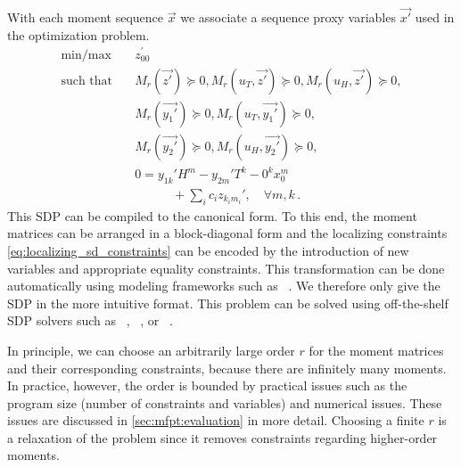 With each moment sequence $\vec x$ we associate a sequence proxy variables $\vec{x'}$
used in the optimization problem.
\begin{equation}\label{eq:sdp_for_fpt}
    \begin{split}
	    \text{min} / \text{max} \hspace{1em}&  z_{00}^{\prime} \\
        \text{such that}\hspace{1em} & M_r(\vec{z'})\succeq 0,
                   M_r({u}_T, \vec{z'})\succeq 0, M_r({u}_H, \vec{z'})\succeq 0,\\
        & M_r(\vec{y_1'}) \succeq 0, M_r({u}_T,\vec{y_1'}) \succeq 0,\\
        & M_r(\vec{y_2'}) \succeq 0, M_r({u}_H, \vec{y_2'}) \succeq 0,\\
        & 0= y_{1k}' H^m -  y_{2m}'T^k - 0^k x_0^m \\
	    &\qquad\quad+\sum_i c_i  z_{k_i m_i}', \quad\forall m, k\,.
    \end{split}
\end{equation}
This \ac{SDP} can be compiled to the canonical form.
To this end, the moment matrices can be arranged in a block-diagonal form and the
localizing constraints \eqref{eq:localizing_sd_constraints} can be encoded
by the introduction of new variables and appropriate equality constraints.
This transformation can be done automatically using modeling frameworks
such as ~\parencite{cvxpy}. We therefore only give the \ac{SDP} in the more intuitive format.
This problem can be solved using off-the-shelf \ac{SDP} solvers such as ~\parencite{mosek},
~\parencite{vandenberghe2010cvxopt}, or ~\parencite{scs}.

In principle, we can choose an arbitrarily large order $r$ for the moment matrices
and their corresponding constraints, because there are
infinitely many moments.
In practice, however, the order is bounded by practical issues such as the program size
(number of constraints and variables) and numerical issues.
These issues are discussed in \autoref{sec:mfpt:evaluation} in more detail.
Choosing a finite $r$ is a relaxation of the problem since it removes constraints regarding
higher-order moments.


